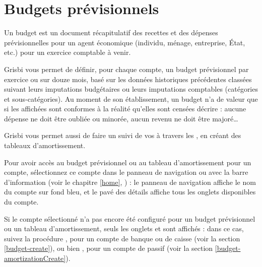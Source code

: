 
\chapter{Budgets prévisionnels\label{budget}}


Un budget est un document récapitulatif des recettes et des dépenses prévisionnelles pour un agent économique (individu, ménage, entreprise, État, etc.) pour un exercice comptable à venir.

Grisbi vous permet de définir, pour chaque compte, un budget prévisionnel par exercice ou sur douze mois, basé sur les données historiques précédentes classées suivant leurs imputations budgétaires ou leurs imputations comptables (catégories et sous-catégories). Au moment de son établissement, un budget n'a de valeur que si les  affichées sont conformes à la réalité qu'elles sont censées décrire  : aucune dépense ne doit être \og oubliée \fg{} ou minorée, aucun revenu ne doit être majoré\ldots

Grisbi vous permet aussi de faire un suivi de vos  à travers les , en créant des tableaux d'amortissement.

Pour avoir accès au budget prévisionnel ou au tableau d'amortissement pour un compte, sélectionnez ce compte dans le panneau de navigation ou avec la barre d'information (voir le chapitre \vref{home}, ) : le panneau de navigation affiche le nom du compte sur fond bleu{\couleur}, et le pavé des détails affiche tous les onglets disponibles du compte. 

Si le compte sélectionné n'a pas encore été configuré pour un budget prévisionnel ou un tableau d'amortissement, seuls les onglets  et  sont affichés : dans ce cas, suivez la procédure , pour un compte de banque ou de caisse (voir la section \vref{budget-create}), ou bien , pour un compte de passif (voir la section \vref{budget-amortizationCreate}).

